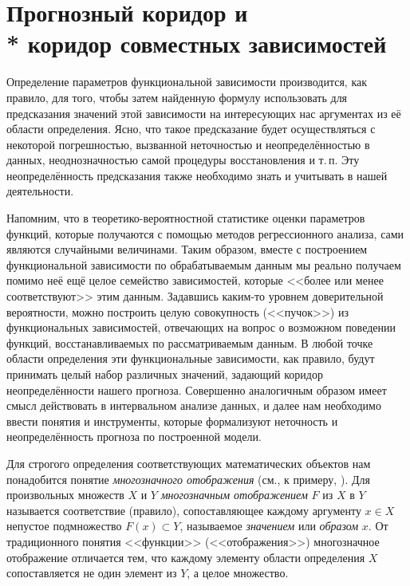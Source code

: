 \documentclass[a5paper,openany]{book}
\begin{document}
\section[Прогнозный коридор, коридор совместных зависимостей] 
        {Прогнозный коридор и \\*  коридор совместных зависимостей} 
\label{CmptFunCorSect} 
  
  
Определение параметров функциональной зависимости производится, как правило, для того, 
чтобы затем найденную формулу использовать для предсказания значений этой зависимости 
на интересующих нас аргументах из её области определения. Ясно, что такое предсказание 
будет осуществляться с некоторой погрешностью, вызванной неточностью и неопределённостью
в данных, неоднозначностью самой процедуры восстановления и т.\,п. Эту неопределённость 
предсказания также необходимо знать и учитывать в нашей деятельности. 
  
Напомним, что в теоретико-вероятностной статистике оценки параметров функций, которые 
получаются с помощью методов регрессионного анализа, сами являются случайными величинами. 
Таким образом, вместе с построением функциональной зависимости по обрабатываемым данным 
мы реально получаем помимо неё ещё целое семейство зависимостей, которые <<более или 
менее соответствуют>> этим данным. Задавшись каким-то уровнем доверительной вероятности, 
можно построить целую совокупность (<<пучок>>) из функциональных зависимостей, отвечающих 
на вопрос о возможном поведении функций, восстанавливаемых по рассматриваемым данным. 
В любой точке области определения эти функциональные зависимости, как правило, будут 
принимать целый набор различных значений, задающий коридор неопределённости нашего 
прогноза. Совершенно аналогичным образом имеет смысл действовать в интервальном анализе 
данных, и далее нам необходимо ввести понятия и инструменты, которые формализуют 
неточность и неопределённость прогноза по построенной модели. 
  
Для строгого определения соответствующих математических объектов нам понадобится понятие 
\emph{многозначного отображения} (см., к примеру, \cite{MultivalMaps, AubinEkeland}). 
Для произвольных множеств $X$ и $Y$ \emph{многозначным отображением} $F$ из $X$ в $Y$ 
называется соответствие (правило), сопоставляющее каждому аргументу $x\in X$ непустое 
подмножество $F(x)\subset Y$, называемое  \emph{значением} или \emph{образом} $x$.  
 От традиционного понятия <<функции>> (<<отображения>>) 
многозначное отображение отличается тем, что каждому элементу области определения $X$ 
сопоставляется не один элемент из $Y$, а целое множество. 
  
\end{document}
